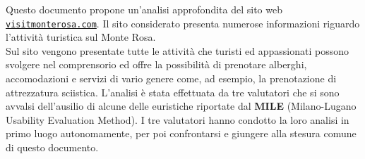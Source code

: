     Questo documento propone un'analisi approfondita del sito
    web \href{https://www.visitmonterosa.com/}{\texttt{visitmonterosa.com}}.
    Il sito considerato presenta numerose informazioni riguardo l'attività
    turistica sul Monte Rosa.\\
    Sul sito vengono presentate tutte le attività che turisti ed
    appassionati possono svolgere nel comprensorio ed offre la possibilità
    di prenotare alberghi, accomodazioni e servizi di vario genere come, ad
    esempio, la prenotazione di attrezzatura sciistica. L'analisi è stata
    effettuata da tre valutatori che si sono avvalsi dell'ausilio di alcune
    delle euristiche riportate dal \textbf{MILE} (Milano-Lugano Usability
    Evaluation Method). I tre valutatori hanno condotto la loro analisi in
    primo luogo autonomamente, per poi confrontarsi e giungere alla stesura
    comune di questo documento.